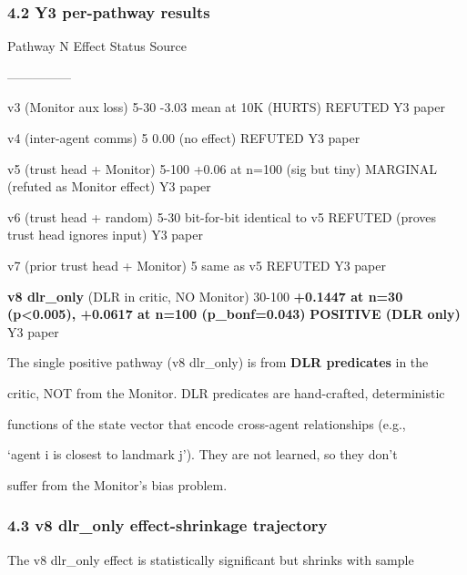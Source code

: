 \documentclass[11pt]{article}
\begin{document}
\subsubsection{4.2 Y3 per-pathway results}\label{y3-per-pathway-results}

Pathway \textbar{} N \textbar{} Effect \textbar{} Status \textbar{}
Source \textbar{}

\textbar---\textbar---\textbar---\textbar---\textbar---\textbar{}

v3 (Monitor aux loss) \textbar{} 5-30 \textbar{} -3.03 mean at 10K
(HURTS) \textbar{} REFUTED \textbar{} Y3 paper \textbar{}

v4 (inter-agent comms) \textbar{} 5 \textbar{} 0.00 (no effect)
\textbar{} REFUTED \textbar{} Y3 paper \textbar{}

v5 (trust head + Monitor) \textbar{} 5-100 \textbar{} +0.06 at n=100
(sig but tiny) \textbar{} MARGINAL (refuted as Monitor effect)
\textbar{} Y3 paper \textbar{}

v6 (trust head + random) \textbar{} 5-30 \textbar{} bit-for-bit
identical to v5 \textbar{} REFUTED (proves trust head ignores input)
\textbar{} Y3 paper \textbar{}

v7 (prior trust head + Monitor) \textbar{} 5 \textbar{} same as v5
\textbar{} REFUTED \textbar{} Y3 paper \textbar{}

\textbf{v8 dlr\_only} (DLR in critic, NO Monitor) \textbar{} 30-100
\textbar{} \textbf{+0.1447 at n=30 (p\textless0.005), +0.0617 at n=100
(p\_bonf=0.043)} \textbar{} \textbf{POSITIVE (DLR only)} \textbar{} Y3
paper \textbar{}

The single positive pathway (v8 dlr\_only) is from \textbf{DLR
predicates} in the

critic, NOT from the Monitor. DLR predicates are hand-crafted,
deterministic

functions of the state vector that encode cross-agent relationships
(e.g.,

`agent i is closest to landmark j'). They are not learned, so they don't

suffer from the Monitor's bias problem.

\subsubsection{4.3 v8 dlr\_only effect-shrinkage
trajectory}\label{v8-dlr_only-effect-shrinkage-trajectory}

The v8 dlr\_only effect is statistically significant but shrinks with
sample
\end{document}
